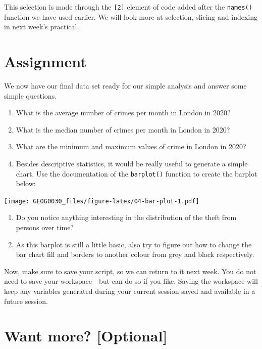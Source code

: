 \documentclass[
]{book}
\providecommand{\tightlist}{%
  \setlength{\itemsep}{0pt}\setlength{\parskip}{0pt}}
\begin{document}
This selection is made through the \texttt{{[}2{]}} element of code added after the \texttt{names()} function we have used earlier. We will look more at selection, slicing and indexing in next week's practical.

\hypertarget{assignment-w04}{%
\section{Assignment}\label{assignment-w04}}

We now have our final data set ready for our simple analysis and answer some simple questions.

\begin{enumerate}
\def\labelenumi{\arabic{enumi}.}
\item
  What is the average number of crimes per month in London in 2020?
\item
  What is the median number of crimes per month in London in 2020?
\item
  What are the minimum and maximum values of crime in London in 2020?
\item
  Besides descriptive statistics, it would be really useful to generate a simple chart. Use the documentation of the \texttt{barplot()} function to create the barplot below:
\end{enumerate}

\texttt{[image: GEOG0030\_files/figure-latex/04-bar-plot-1.pdf]}

\begin{enumerate}
\def\labelenumi{\arabic{enumi}.}
\setcounter{enumi}{4}
\tightlist
\item
  Do you notice anything interesting in the distribution of the theft from persons over time?
\item
  As this barplot is still a little basic, also try to figure out how to change the bar chart fill and borders to another colour from grey and black respectively.
\end{enumerate}

Now, make sure to save your script, so we can return to it next week. You do not need to save your workspace - but can do so if you like. Saving the workspace will keep any variables generated during your current session saved and available in a future session.

\hypertarget{want-more-optional}{%
\section{Want more? {[}Optional{]}}\label{want-more-optional}}
\end{document}

